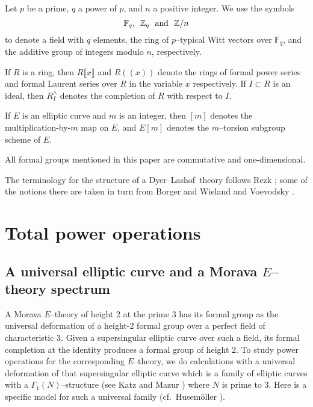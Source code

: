 \documentclass[microtype]{gtpart}     %
\theoremstyle{remark}
\theoremstyle{definition}
\newcommand{\mb}[1]{\mathbb{#1}}
\newcommand{\DL}{Dyer--Lashof~}
\newcommand{\BF}{{\mb F}}
\newcommand{\BZ}{{\mb Z}}
\newcommand{\ad}{{\rm and}}
\newcommand{\G}{\Gamma}
\begin{document}
Let $p$ be a prime, $q$ a power of $p$, and $n$ a positive integer.  We use 
the symbols 
\[
 \BF_q\text{,}~~\BZ_q~~\ad~~\BZ/n 
\]
to denote a field with $q$ elements, the ring of $p$--typical Witt vectors 
over $\BF_q$, and the additive group of integers modulo $n$, respectively.  

If $R$ is a ring, then $R\llbracket x \rrbracket$ and $R (\!(x)\!)$ denote 
the rings of formal power series and formal Laurent series over $R$ in the 
variable $x$ respectively.  If $I \subset R$ is an ideal, then $R_I^\wedge$ 
denotes the completion of $R$ with respect to $I$.  

If $E$ is an elliptic curve and $m$ is an integer, then $[m]$ denotes the 
multiplication-by-$m$ map on $E$, and $E[m]$ denotes the $m$--torsion 
subgroup scheme of $E$.  

All formal groups mentioned in this paper are commutative and 
one-dimensional.  

The terminology for the structure of a \DL theory follows Rezk 
\cite{cong, h2p2}; some of the notions there are taken in turn from Borger 
and Wieland \cite{BW} and Voevodsky \cite{V}.  


\section{Total power operations}
\label{sec:total}

\subsection{A universal elliptic curve and a Morava $E$--theory spectrum}
\label{subsec:ec}

A Morava $E$--theory of height 2 at the prime 3 has its formal group as the 
universal deformation of a height-2 formal group over a perfect field of 
characteristic 3.  Given a supersingular elliptic curve over such a field, 
its formal completion at the identity produces a formal group of height 2.  
To study power operations for the corresponding $E$--theory, we do 
calculations with a universal deformation of that supersingular elliptic 
curve which is a family of elliptic curves with a $\G_1(N)$--structure (see 
Katz and Mazur \cite[Section 3.2]{KM}) where $N$ is prime to 3.  Here is a 
specific model for such a universal family (cf.~Husem\"oller 
\cite[4(4.6a)]{husemoller}).  
\end{document}
